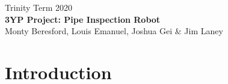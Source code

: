 \documentclass[11pt]{article}		%
\begin{document}
	
	\flushleft
	\raggedright

	\begin{center}
		\vspace*{2cm}
		Trinity Term 2020\\ %
		\vspace*{6cm}
		\huge{\textbf{3YP Project: Pipe Inspection Robot}}\\ 
		\vspace*{6cm}
		\large{Monty Beresford, Louis Emanuel, Joshua Gei \& Jim Laney} %
		\thispagestyle{empty} %
	\end{center}

	\newpage
	
	\tableofcontents
	\thispagestyle{empty} %
	\newpage

	\setcounter{page}{1}
	
	\section{Introduction}
	
\end{document}
